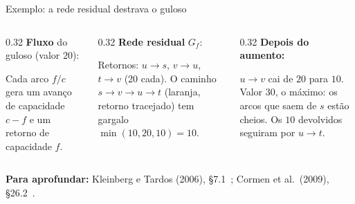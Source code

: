 \documentclass[aspectratio=169,xcolor=table]{beamer}
\newcommand{\nosKT}{%
  \node[vert] (s) at (0,0) {$s$};   \node[vert] (u) at (1.5,0.9) {$u$};
  \node[vert] (v) at (1.5,-0.9) {$v$}; \node[vert] (t) at (3,0) {$t$};
}
\newcommand{\redeKT}[1]{%
  \nosKT
  \foreach \u/\v/\l/\e in {#1} \draw[\e] (\u) to (\v);
  \foreach \u/\v/\l/\e in {#1} \path[\e, draw=none] (\u) to node[peso] {\l} (\v);
}
\newcommand{\fonte}[1]{%
  \vfill
  {\tiny\color{gray!55!black}\textbf{Para aprofundar:} #1\par}%
}
\begin{document}
\begin{frame}{Exemplo: a rede residual destrava o guloso}
  \begin{columns}[T]
    \begin{column}{0.32\textwidth}
      \scriptsize
      \textbf{Fluxo} do guloso (valor $20$):
      \begin{center}
      \end{center}
      Cada arco $f/c$ gera um avanço de capacidade $c - f$ e um retorno de capacidade $f$.
    \end{column}
    \begin{column}{0.32\textwidth}
      \scriptsize
      \textbf{Rede residual} $G_f$:
      \begin{center}
      \end{center}
      Retornos: $u \to s$, $v \to u$, $t \to v$ (20 cada). O caminho $s \to v \to u \to t$
      (laranja, retorno tracejado) tem gargalo $\min(10, 20, 10) = 10$.
    \end{column}
    \begin{column}{0.32\textwidth}
      \scriptsize
      \textbf{Depois do aumento:}
      \begin{center}
      \end{center}
      $u \to v$ cai de $20$ para $10$. Valor $30$, o máximo: os arcos que saem de $s$ estão
      cheios. Os $10$ devolvidos seguiram por $u \to t$.
    \end{column}
  \end{columns}
  \fonte{Kleinberg e Tardos (2006), \S 7.1~\cite{kleinberg2006algorithm};
    Cormen et al.\ (2009), \S 26.2~\cite{cormen2009introduction}.}
\end{frame}
\end{document}
